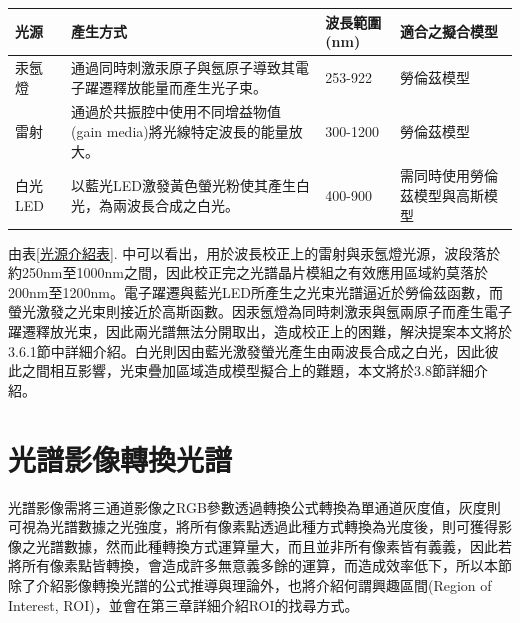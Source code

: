 \begin{center}
\vspace{0.8cm}
\label{光源介紹表}	
\begin{tabularx}{\textwidth}{|m{}<{\centering}|m{}<{\centering}|m{}<{\centering}|m{}<{\centering}|}
	\hline
	光源&產生方式 & 波長範圍(nm) & 適合之擬合模型\\		
	\hline
	汞氬燈&\multicolumn{1}{m{0.3\textwidth}|}{通過同時刺激汞原子與氬原子導致其電子躍遷釋放能量而產生光子束。}&253-922&勞倫茲模型\\
	\hline
	雷射&\multicolumn{1}{m{0.3\textwidth}|}{通過於共振腔中使用不同增益物值(gain media)將光線特定波長的能量放大。}&300-1200&勞倫茲模型\\
	\hline
	白光LED&\multicolumn{1}{m{0.3\textwidth}|}{以藍光LED激發黃色螢光粉使其產生白光，為兩波長合成之白光。}&400-900&\multicolumn{1}{m{0.236\textwidth}|}{需同時使用勞倫茲模型與高斯模型}\\
	\hline
\end{tabularx}
\vspace{10pt}
\end{center}
\par
由表\ref{光源介紹表}. 中可以看出，用於波長校正上的雷射與汞氬燈光源，波段落於約250nm至1000nm之間，因此校正完之光譜晶片模組之有效應用區域約莫落於200nm至1200nm。電子躍遷\cite{42310}與藍光LED所產生之光束光譜逼近於勞倫茲函數\cite{Lorentz-1}，而螢光激發之光束則接近於高斯函數。因汞氬燈為同時刺激汞與氬兩原子而產生電子躍遷釋放光束，因此兩光譜無法分開取出，造成校正上的困難，解決提案本文將於3.6.1節中詳細介紹。白光則因由藍光激發螢光產生由兩波長合成之白光，因此彼此之間相互影響，光束疊加區域造成模型擬合上的難題，本文將於3.8節詳細介紹。
\section{光譜影像轉換光譜}
光譜影像需將三通道影像之RGB參數透過轉換公式轉換為單通道灰度值，灰度則可視為光譜數據之光強度\cite{RGB-to-Spectrum}\cite{gray_as_Intensity}，將所有像素點透過此種方式轉換為光度後，則可獲得影像之光譜數據，然而此種轉換方式運算量大，而且並非所有像素皆有義義，因此若將所有像素點皆轉換，會造成許多無意義多餘的運算，而造成效率低下，所以本節除了介紹影像轉換光譜的公式推導與理論外，也將介紹何謂興趣區間(Region of Interest, ROI)，並會在第三章詳細介紹ROI的找尋方式。

